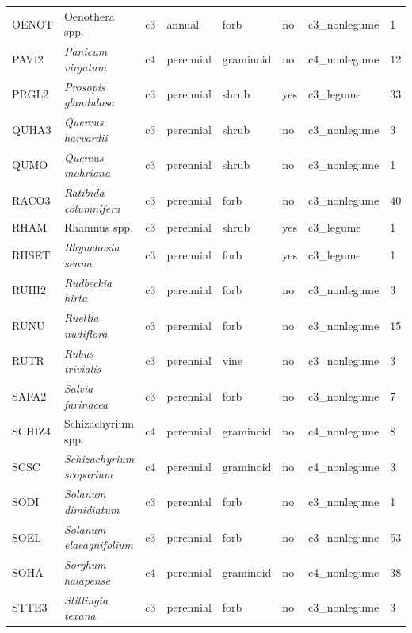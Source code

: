 \begin{landscape}
\begin{table}[]
{\begin{tabular}{p{2cm}p{5cm}p{2cm}p{2cm}p{2cm}p{2cm}p{3.5cm}p{2cm}}
        OENOT  & Oenothera spp.                     & c3 & annual    & forb           & no  & c3\_nonlegume & 1  \\
        PAVI2  & \textit{Panicum virgatum}          & c4 & perennial & graminoid      & no  & c4\_nonlegume & 12 \\
        PRGL2  & \textit{Prosopis glandulosa}       & c3 & perennial & shrub          & yes & c3\_legume    & 33 \\
        QUHA3  & \textit{Quercus harvardii}         & c3 & perennial & shrub          & no  & c3\_nonlegume & 3  \\
        QUMO   & \textit{Quercus mohriana}          & c3 & perennial & shrub          & no  & c3\_nonlegume & 1  \\
        RACO3  & \textit{Ratibida columnifera}      & c3 & perennial & forb           & no  & c3\_nonlegume & 40 \\
        RHAM   & Rhamnus spp.                       & c3 & perennial & shrub          & yes & c3\_legume    & 1  \\
        RHSET  & \textit{Rhynchosia senna}          & c3 & perennial & forb           & yes & c3\_legume    & 1  \\
        RUHI2  & \textit{Rudbeckia hirta}           & c3 & perennial & forb           & no  & c3\_nonlegume & 3  \\
        RUNU   & \textit{Ruellia nudiflora}         & c3 & perennial & forb           & no  & c3\_nonlegume & 15 \\
        RUTR   & \textit{Rubus trivialis}           & c3 & perennial & vine           & no  & c3\_nonlegume & 3  \\
        SAFA2  & \textit{Salvia farinacea}          & c3 & perennial & forb           & no  & c3\_nonlegume & 7  \\
        SCHIZ4 & Schizachyrium spp.                 & c4 & perennial & graminoid      & no  & c4\_nonlegume & 8  \\
        SCSC   & \textit{Schizachyrium scoparium}   & c4 & perennial & graminoid      & no  & c4\_nonlegume & 3  \\
        SODI   & \textit{Solanum dimidiatum}        & c3 & perennial & forb           & no  & c3\_nonlegume & 1  \\
        SOEL   & \textit{Solanum elaeagnifolium}    & c3 & perennial & forb           & no  & c3\_nonlegume & 53 \\
        SOHA   & \textit{Sorghum halapense}         & c4 & perennial & graminoid      & no  & c4\_nonlegume & 38 \\
        STTE3  & \textit{Stillingia texana}         & c3 & perennial & forb           & no  & c3\_nonlegume & 3
    \end{tabular}}
\end{table}
\end{landscape}
\clearpage

